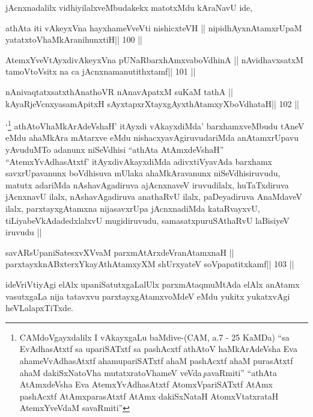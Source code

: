 \begin{artha}
jAcnxnadalilx vidhiyilalxveMbudakekx matotxMdu kAraNavU ide, 
\end{artha}

\begin{shl}
athAta iti vAkeyxVna hayxhameVveVti nishicxteVH ||
nipidhAyxnAtamxrUpaM yatatxtoV\s haMkAranihunxtiH\hfill || 100 ||
\end{shl}

\begin{shl}
AtemxYveVtAyxdivAkeyxVna pUNaRbarxhAmxvaboVdhinA ||
nAvidhavxsatxM tamoV\s toV\s sitx na ca jAcnxnamanutithxtamf\hfill || 101 ||
\end{shl}

\begin{shl}
nAnivaqtatxsatxthA\s nathoVR nAnavApatxM suKaM tathA ||
kAyaRjeVcnxyasamApitxH sAyxtapxrXtayxgAyxthAtamxyXboVdhataH\hfill || 102 ||
\end{shl}

\begin{artha}
`\footnote[1]{CAMdoVgayxdalilx I vAkayxgaLu baMdive-(CAM, a.7 - 25
    KaMDa) ``sa EvAdhasAtxtf sa upariSATxtf sa pashAcxtf athAtoV\s
    haMkArAdeVsha Eva ahameVvAdhasAtxtf ahamupariSATxtf ahaM pashAcxtf
  ahaM purasAtxtf ahaM dakiSxNatoV\s ha mutatxratoV\s hameV
  veVda\c\ savaRmiti'' ``athAta AtAmxdeVsha Eva AtemxYvAdhasAtxtf
  AtomxVpariSATxtf AtAmx pashAcxtf AtAmxparasAtxtf AtAmx dakiSxNataH
  AtomxVtatxrataH AtemxYveVdaM savaRmiti''}
athAtoV\s haMkArAdeVshaH' itAyxdi vAkayxdiMda'
  barxhamxveMbudu tAneV eMdu ahaMkAra mAtarxve eMdu
  nishacxyavAgiruvudariMda anAtamxrUpavu yAvuduMTo adanunx niSeVdhisi
  ``athAta AtAmxdeVshaH'' ``AtemxYvAdhasAtxtf' itAyxdivAkayxdiMda
  adivxtiVyavAda barxhamx savxrUpavanunx boVdhisuva mUlaka
  ahaMkAravanunx niSeVdhisiruvudu, matutx adariMda nAshavAgadiruva
  ajAcnxnaveV iruvudilalx, huTaTxdiruva jAcnxnavU ilalx,
  nAshavAgadiruva anathaRvU ilalx, paDeyadiruva AnaMdaveV ilalx,
  parxtayxgAtamxna nijasavxrUpa jAcnxnadiMda kataRvayxvU,
  tiLiyabeVkAdadedxlalxvU mugidiruvudu, samasatxpuruSAthaRvU laBisiyeV
  iruvudu ||
\end{artha}

\begin{shl}
savARsUpaniSatesxvXVvaM parxmAtArxdeVranAtamxnaH ||
parxtayxknABxterxYkayAthAtamxyXM shUrxyateV soVpapatitxkamf\hfill || 103 ||
\end{shl}

\begin{artha}
ideVriVtiyAgi elAlx upaniSatutxgaLalUlx parxmAtaqmuMtAda elAlx anAtamx
vasutxgaLa nija tatavxvu parxtayxgAtamxvoMdeV eMdu yukitx yukatxvAgi heVLalapxTiTxde.
\end{artha}

